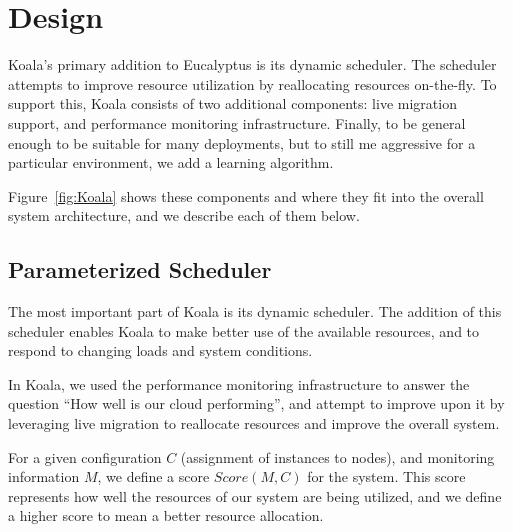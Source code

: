 \section{Design}
\label{sec:design}




Koala's primary addition to Eucalyptus is its dynamic scheduler.  The scheduler
attempts to improve resource utilization by reallocating resources on-the-fly.
To support this, Koala consists of two additional components: live migration
support, and performance monitoring infrastructure.  Finally, to be general
enough to be suitable for many deployments, but to still me aggressive for a
particular environment, we add a learning algorithm.

Figure~\ref{fig:Koala} shows these components and where they fit into the
overall system architecture, and we describe each of them below.


\subsection{Parameterized Scheduler}

The most important part of Koala is its dynamic scheduler.  The addition of this
scheduler enables Koala to make better use of the available resources, and to
respond to changing loads and system conditions.

In Koala, we used the performance monitoring infrastructure to answer the
question ``How well is our cloud performing'', and attempt to improve upon it by
leveraging live migration to reallocate resources and improve the overall
system.

For a given configuration $C$ (assignment of instances to nodes), and
monitoring information $M$, we define a score $Score(M,C)$ for the system.  This
score represents how well the resources of our system are being utilized, and we
define a higher score to mean a better resource allocation.

